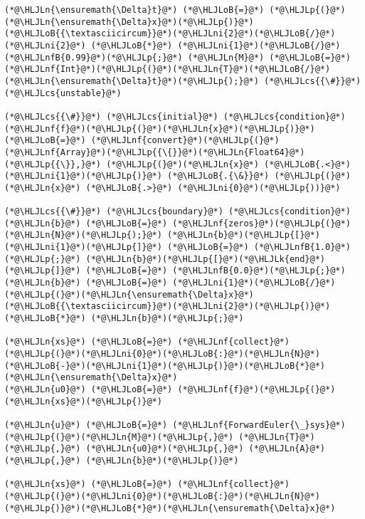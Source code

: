\documentclass[12pt,a4paper]{article}
\newcommand{\HLJLk}[1]{\textcolor[RGB]{148,91,176}{\textbf{#1}}}
\newcommand{\HLJLn}[1]{#1}
\newcommand{\HLJLnf}[1]{\textcolor[RGB]{66,102,213}{#1}}
\newcommand{\HLJLnfB}[1]{\textcolor[RGB]{59,151,46}{#1}}
\newcommand{\HLJLni}[1]{\textcolor[RGB]{59,151,46}{#1}}
\newcommand{\HLJLoB}[1]{\textcolor[RGB]{102,102,102}{\textbf{#1}}}
\newcommand{\HLJLp}[1]{#1}
\newcommand{\HLJLcs}[1]{\textcolor[RGB]{153,153,119}{\textit{#1}}}
\begin{document}
\begin{lstlisting}
(*@\HLJLn{\ensuremath{\Delta}t}@*) (*@\HLJLoB{=}@*) (*@\HLJLp{(}@*)(*@\HLJLn{\ensuremath{\Delta}x}@*)(*@\HLJLp{)}@*)(*@\HLJLoB{{\textasciicircum}}@*)(*@\HLJLni{2}@*)(*@\HLJLoB{/}@*)(*@\HLJLni{2}@*) (*@\HLJLoB{*}@*) (*@\HLJLni{1}@*)(*@\HLJLoB{/}@*)(*@\HLJLnfB{0.99}@*)(*@\HLJLp{;}@*) (*@\HLJLn{M}@*) (*@\HLJLoB{=}@*) (*@\HLJLnf{Int}@*)(*@\HLJLp{(}@*)(*@\HLJLn{T}@*)(*@\HLJLoB{/}@*)(*@\HLJLn{\ensuremath{\Delta}t}@*)(*@\HLJLp{);}@*) (*@\HLJLcs{{\#}}@*) (*@\HLJLcs{unstable}@*)

(*@\HLJLcs{{\#}}@*) (*@\HLJLcs{initial}@*) (*@\HLJLcs{condition}@*)
(*@\HLJLnf{f}@*)(*@\HLJLp{(}@*)(*@\HLJLn{x}@*)(*@\HLJLp{)}@*) (*@\HLJLoB{=}@*) (*@\HLJLnf{convert}@*)(*@\HLJLp{(}@*)(*@\HLJLnf{Array}@*)(*@\HLJLp{{\{}}@*)(*@\HLJLn{Float64}@*)(*@\HLJLp{{\}},}@*) (*@\HLJLp{(}@*)(*@\HLJLn{x}@*) (*@\HLJLoB{.<}@*) (*@\HLJLni{1}@*)(*@\HLJLp{)}@*) (*@\HLJLoB{.{\&}}@*) (*@\HLJLp{(}@*)(*@\HLJLn{x}@*) (*@\HLJLoB{.>}@*) (*@\HLJLni{0}@*)(*@\HLJLp{))}@*)

(*@\HLJLcs{{\#}}@*) (*@\HLJLcs{boundary}@*) (*@\HLJLcs{condition}@*)
(*@\HLJLn{b}@*) (*@\HLJLoB{=}@*) (*@\HLJLnf{zeros}@*)(*@\HLJLp{(}@*)(*@\HLJLn{N}@*)(*@\HLJLp{);}@*) (*@\HLJLn{b}@*)(*@\HLJLp{[}@*)(*@\HLJLni{1}@*)(*@\HLJLp{]}@*) (*@\HLJLoB{=}@*) (*@\HLJLnfB{1.0}@*)(*@\HLJLp{;}@*) (*@\HLJLn{b}@*)(*@\HLJLp{[}@*)(*@\HLJLk{end}@*)(*@\HLJLp{]}@*) (*@\HLJLoB{=}@*) (*@\HLJLnfB{0.0}@*)(*@\HLJLp{;}@*) (*@\HLJLn{b}@*) (*@\HLJLoB{=}@*) (*@\HLJLni{1}@*)(*@\HLJLoB{/}@*)(*@\HLJLp{(}@*)(*@\HLJLn{\ensuremath{\Delta}x}@*)(*@\HLJLoB{{\textasciicircum}}@*)(*@\HLJLni{2}@*)(*@\HLJLp{)}@*) (*@\HLJLoB{*}@*) (*@\HLJLn{b}@*)(*@\HLJLp{;}@*)

(*@\HLJLn{xs}@*) (*@\HLJLoB{=}@*) (*@\HLJLnf{collect}@*)(*@\HLJLp{(}@*)(*@\HLJLni{0}@*)(*@\HLJLoB{:}@*)(*@\HLJLn{N}@*)(*@\HLJLoB{-}@*)(*@\HLJLni{1}@*)(*@\HLJLp{)}@*)(*@\HLJLoB{*}@*)(*@\HLJLn{\ensuremath{\Delta}x}@*)
(*@\HLJLn{u0}@*) (*@\HLJLoB{=}@*) (*@\HLJLnf{f}@*)(*@\HLJLp{(}@*)(*@\HLJLn{xs}@*)(*@\HLJLp{)}@*)

(*@\HLJLn{u}@*) (*@\HLJLoB{=}@*) (*@\HLJLnf{ForwardEuler{\_}sys}@*)(*@\HLJLp{(}@*)(*@\HLJLn{M}@*)(*@\HLJLp{,}@*) (*@\HLJLn{T}@*)(*@\HLJLp{,}@*) (*@\HLJLn{u0}@*)(*@\HLJLp{,}@*) (*@\HLJLn{A}@*)(*@\HLJLp{,}@*) (*@\HLJLn{b}@*)(*@\HLJLp{)}@*)

(*@\HLJLn{xs}@*) (*@\HLJLoB{=}@*) (*@\HLJLnf{collect}@*)(*@\HLJLp{(}@*)(*@\HLJLni{0}@*)(*@\HLJLoB{:}@*)(*@\HLJLn{N}@*)(*@\HLJLp{)}@*)(*@\HLJLoB{*}@*)(*@\HLJLn{\ensuremath{\Delta}x}@*)


\end{lstlisting}
\end{document}
